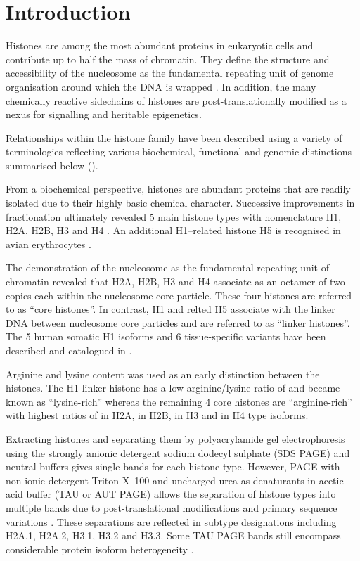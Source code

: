 \section{Introduction}

  Histones are among the most abundant proteins in eukaryotic cells and contribute up to half the mass of chromatin. 
  They define the structure and accessibility of the nucleosome as the fundamental repeating unit of genome organisation 
  around which the DNA is wrapped .
  In addition, the many chemically reactive sidechains of histones are post-translationally modified 
  as a nexus for signalling and heritable epigenetics. 

  Relationships within the histone family have been described using a variety of terminologies
  reflecting various biochemical, functional and genomic distinctions summarised below ().
  
  From a biochemical perspective, histones are abundant proteins 
  that are readily isolated due to their highly basic chemical character. 
  Successive improvements in fractionation ultimately revealed 5 main histone types 
  with nomenclature H1, H2A, H2B, H3 and H4 \citep{nomenclature}.
  An additional H1--related histone H5 is recognised in avian erythrocytes \citep{HFive-review}.

  The demonstration of the nucleosome as the fundamental repeating unit of chromatin  
  revealed that H2A, H2B, H3 and H4 associate as an octamer of two copies each within the
  nucleosome core particle. These four histones are referred to as ``core histones''. 
  In contrast, H1 and relted H5 associate with the linker DNA between nucleosome core particles 
  and are referred to as ``linker histones''. 
  The 5 human somatic H1 isoforms and 6 tissue-specific variants have been described and catalogued in .

  Arginine and lysine content was used as an early distinction between the histones. 
  The H1 linker histone has a low arginine/lysine ratio of \LinkerArgLysRatio{} and became known as ``lysine-rich'' 
  whereas the remaining 4 core histones are ``arginine-rich'' 
  with highest ratios of \HTwoAArgLysRatio{} in H2A,  \HTwoBArgLysRatio{} in H2B, 
  \HThreeArgLysRatio{} in H3 and \HFourArgLysRatio{} in H4 type isoforms.

  Extracting histones and separating them by polyacrylamide gel electrophoresis 
  using the strongly anionic detergent sodium dodecyl sulphate (SDS PAGE) and neutral buffers 
  gives single bands for each histone type. 
  However, PAGE with non-ionic detergent Triton X--100 and uncharged urea as denaturants
  in acetic acid buffer (TAU or AUT PAGE) allows the separation of histone types into multiple bands 
  due to post-translational modifications and primary sequence variations \citep{PAGEND}. 
  These separations are reflected in subtype designations including H2A.1, H2A.2, H3.1, H3.2 and H3.3. 
  Some TAU PAGE bands still encompass considerable protein isoform heterogeneity \addref{}.

